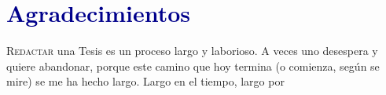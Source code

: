 \pagestyle{empty}
\section*{\centering \Huge{\textcolor{DarkBlue}{Agradecimientos}}}
\lettrine[lraise=0.1, nindent=0em, slope=-.5em, lines=4]{\color{Red}R}{edactar} una Tesis es un proceso largo y laborioso. A veces uno desespera y quiere abandonar, porque este camino que hoy termina (o comienza, según se mire) se me ha hecho largo. Largo en el tiempo, largo por 

\cleardoublepage